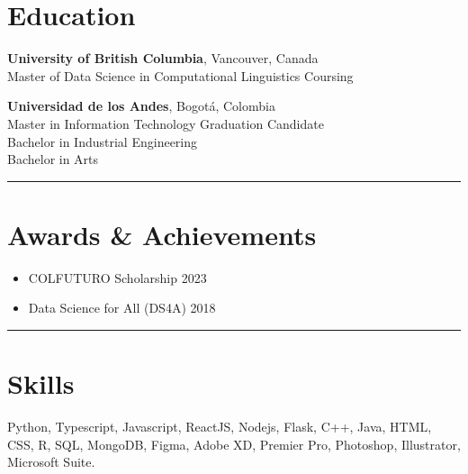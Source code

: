 \documentclass[10pt,a4paper]{article}
\begin{document}
\section*{Education}

\textbf{University of British Columbia}, Vancouver, Canada \\
Master of Data Science in Computational Linguistics \hfill Coursing

\textbf{Universidad de los Andes}, Bogotá, Colombia \\
Master in Information Technology \hfill Graduation Candidate \\
Bachelor in Industrial Engineering \\
Bachelor in Arts

\rule{\textwidth}{0.4pt} 

\section*{Awards \& Achievements}

\begin{itemize}[noitemsep]
    \item COLFUTURO Scholarship \hfill 2023
    \item Data Science for All (DS4A)  \hfill 2018
\end{itemize}

\rule{\textwidth}{0.4pt} 
\section*{Skills}

Python, Typescript, Javascript, ReactJS, Nodejs, Flask, C++, Java, HTML, CSS, R, SQL, MongoDB, Figma, Adobe XD, Premier Pro, Photoshop, Illustrator, Microsoft Suite.
\end{document}
